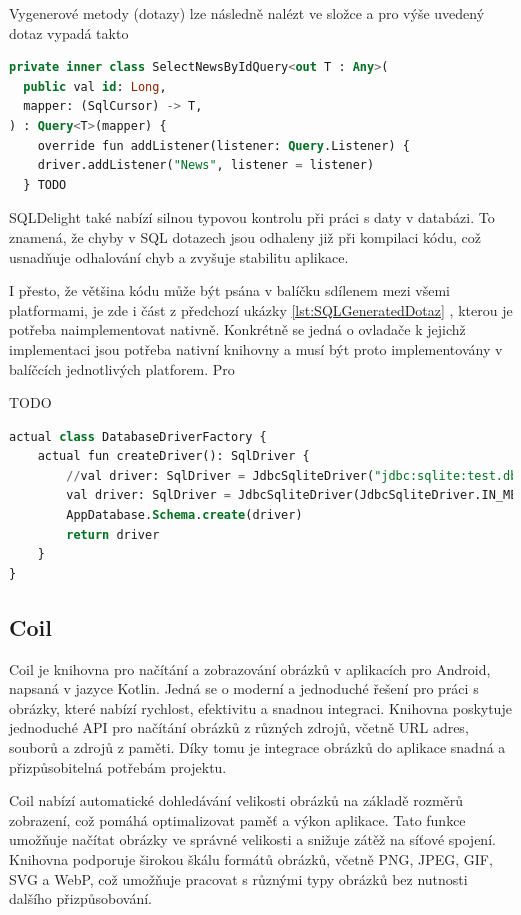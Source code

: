 Vygenerové metody (dotazy) lze následně nalézt ve složce \code{} a pro výše uvedený dotaz vypadá takto

\begin{lstlisting}[caption={SQL vygenerovaný dotaz}, label={lst:SQLGeneratedDotaz}, language=SQL]
private inner class SelectNewsByIdQuery<out T : Any>(
  public val id: Long,
  mapper: (SqlCursor) -> T,
) : Query<T>(mapper) {
    override fun addListener(listener: Query.Listener) {
    driver.addListener("News", listener = listener)
  } TODO
  \end{lstlisting}
  

SQLDelight také nabízí silnou typovou kontrolu při práci s daty v databázi. To znamená, že chyby v SQL dotazech jsou odhaleny již při
 kompilaci kódu, což usnadňuje odhalování chyb a zvyšuje stabilitu aplikace.

I přesto, že většina kódu může být psána v balíčku sdílenem mezi všemi platformami, je zde i část z předchozí ukázky \ref{lst:SQLGeneratedDotaz}
, kterou je potřeba naimplementovat nativně. Konkrétně se jedná o ovladače k jejichž implementaci jsou potřeba nativní knihovny a musí
být proto implementovány v balíčcích jednotlivých platforem. Pro 

TODO
\begin{lstlisting}[caption={SQL vygenerovaný dotaz}, label={lst:SQLGeneratedDotaz}, language=SQL]
  actual class DatabaseDriverFactory {
    actual fun createDriver(): SqlDriver {
        //val driver: SqlDriver = JdbcSqliteDriver("jdbc:sqlite:test.db")
        val driver: SqlDriver = JdbcSqliteDriver(JdbcSqliteDriver.IN_MEMORY)
        AppDatabase.Schema.create(driver)
        return driver
    }
}
\end{lstlisting}


\subsection{Coil}
Coil je knihovna pro načítání a zobrazování obrázků v aplikacích pro Android, napsaná v jazyce Kotlin. Jedná se o moderní a jednoduché 
řešení pro práci s obrázky, které nabízí rychlost, efektivitu a snadnou integraci. Knihovna poskytuje jednoduché API pro načítání obrázků 
z různých zdrojů, včetně URL adres, souborů a zdrojů z paměti. Díky tomu je integrace obrázků do aplikace snadná a přizpůsobitelná potřebám projektu.

Coil nabízí automatické dohledávání velikosti obrázků na základě rozměrů zobrazení, což pomáhá optimalizovat paměť a výkon aplikace. Tato funkce 
umožňuje načítat obrázky ve správné velikosti a snižuje zátěž na síťové spojení. Knihovna podporuje širokou škálu formátů obrázků, včetně PNG, 
JPEG, GIF, SVG a WebP, což umožňuje pracovat s různými typy obrázků bez nutnosti dalšího přizpůsobování.


